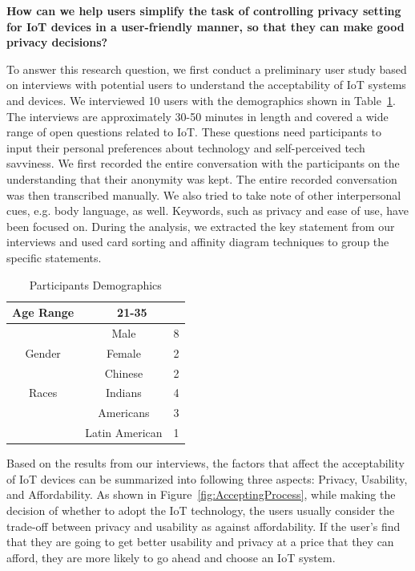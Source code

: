 \textbf{How can we help users simplify the task of controlling privacy setting for IoT devices in a user-friendly manner, so that they can make good privacy decisions?}

To answer this research question, we first conduct a preliminary user study based on interviews with potential users to understand the acceptability of IoT systems and devices. We interviewed 10 users with the demographics shown in Table~\ref{tab:demographics1}. The interviews are approximately 30-50 minutes in length and covered a wide range of open questions related to IoT. These questions need participants to input their personal preferences about technology and self-perceived tech savviness. We first recorded the entire conversation with the participants on the understanding that their anonymity was kept. The entire recorded conversation was then transcribed manually. We also tried to take note of other interpersonal cues, e.g. body language, as well. Keywords, such as privacy and ease of use, have been focused on. During the analysis, we extracted the key statement from our interviews and used card sorting and affinity diagram techniques to group the specific statements.

\begin {table}
\caption {Participants Demographics} \label{tab:demographics1}
\vspace{8pt}
\begin{center}
	\begin{tabular}{|c|c|c|}
		\hline
		Age Range & \multicolumn{2}{c|}{ 21-35 }\\
		\hline
		& Male & 8 \\
		\cline{2-3}
		Gender    & Female & 2 \\
		\hline
		& Chinese & 2 \\
		\cline{2-3}
		Races 	  & Indians & 4 \\
		\cline{2-3}
		& Americans & 3 \\
		\cline{2-3}
		& Latin American & 1\\
		\hline
	\end{tabular}
\end{center}
\end {table}

Based on the results from our interviews, the factors that affect the acceptability of IoT devices can be summarized into following three aspects: Privacy, Usability, and Affordability. As shown in Figure~\ref{fig:AcceptingProcess}, while making the decision of whether to adopt the IoT technology, the users usually consider the trade-off between privacy and usability as against affordability. If the user's find that they are going to get better usability and privacy at a price that they can afford, they are more likely to go ahead and choose an IoT system. 

